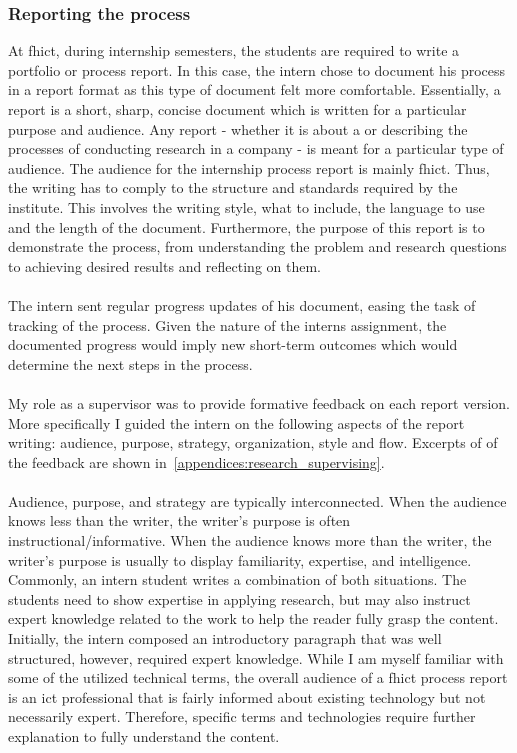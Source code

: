 \subsubsection{Reporting the process}
At \acrshort{fhict}, during internship semesters, the students are required to write a portfolio or process report. 
In this case, the intern chose to document his process in a report format as this type of document felt more comfortable.
Essentially, a report is a short, sharp, concise document which is written for a particular purpose and audience.
Any report - whether it is about a or describing the processes of conducting research in a company - is meant for a particular type of audience. 
The audience for the internship process report is mainly \acrshort{fhict}. 
Thus, the writing has to comply to the structure and standards required by the institute. 
This involves the writing style, what to include, the language to use and the length of the document. 
Furthermore, the purpose of this report is to demonstrate the process, from understanding the problem and research questions to achieving desired results and reflecting on them.
\\\\
The intern sent regular progress updates of his document, easing the task of tracking of the process. 
Given the nature of the interns assignment, the documented progress would imply new short-term outcomes which would determine the next steps in the process.\\\\
My role as a supervisor was to provide formative feedback on each report version. More specifically I guided the intern on the following aspects of the report writing: audience, purpose, strategy, organization, style and flow. Excerpts of of the feedback are shown in~\cref{appendices:research_supervising}.
\\\\
Audience, purpose, and strategy are typically interconnected. 
When the audience knows less than the writer, the writer’s purpose is often instructional/informative. 
When the audience knows more than the writer, the writer’s purpose is usually to display familiarity, expertise, and intelligence. 
Commonly, an intern student writes a combination of both situations. 
The students need to show expertise in applying research, but may also instruct expert knowledge related to the work to help the reader fully grasp the content.
Initially, the intern composed an introductory paragraph that was well structured, however, required expert knowledge. While I am myself familiar with some of the utilized technical terms, the overall audience of a \acrshort{fhict} process report is an \acrshort{ict} professional that is fairly informed about existing technology but not necessarily expert. Therefore, specific terms and technologies require further explanation to fully understand the content.
